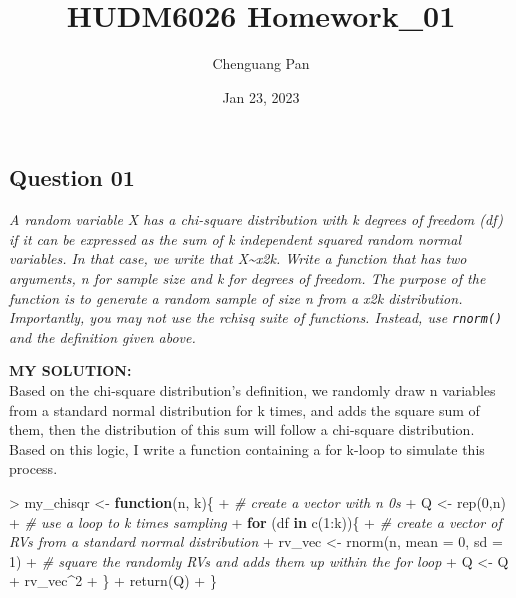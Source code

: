 \documentclass[
]{article}
\title{HUDM6026 Homework\_01}
\author{Chenguang Pan}
\date{Jan 23, 2023}
\newenvironment{Shaded}{\begin{snugshade}}{\end{snugshade}}
\newcommand{\AttributeTok}[1]{\textcolor[rgb]{0.77,0.63,0.00}{#1}}
\newcommand{\CommentTok}[1]{\textcolor[rgb]{0.56,0.35,0.01}{\textit{#1}}}
\newcommand{\ControlFlowTok}[1]{\textcolor[rgb]{0.13,0.29,0.53}{\textbf{#1}}}
\newcommand{\DecValTok}[1]{\textcolor[rgb]{0.00,0.00,0.81}{#1}}
\newcommand{\FunctionTok}[1]{\textcolor[rgb]{0.00,0.00,0.00}{#1}}
\newcommand{\NormalTok}[1]{#1}
\newcommand{\OtherTok}[1]{\textcolor[rgb]{0.56,0.35,0.01}{#1}}
\newcommand{\SpecialCharTok}[1]{\textcolor[rgb]{0.00,0.00,0.00}{#1}}
\begin{document}
\maketitle

\hypertarget{question-01}{%
\subsection{Question 01}\label{question-01}}

\emph{A random variable X has a chi-square distribution with k degrees
of freedom (df) if it can be expressed as the sum of k independent
squared random normal variables. In that case, we write that
X\textasciitilde x2k. Write a function that has two arguments, n for
sample size and k for degrees of freedom. The purpose of the function is
to generate a random sample of size n from a x2k distribution.
Importantly, you may not use the rchisq suite of functions. Instead, use
\texttt{rnorm()} and the definition given above. }

\textbf{MY SOLUTION:}\\
Based on the chi-square distribution's definition, we randomly draw n
variables from a standard normal distribution for k times, and adds the
square sum of them, then the distribution of this sum will follow a
chi-square distribution. Based on this logic, I write a function
containing a for k-loop to simulate this process.

\begin{Shaded}
\begin{Highlighting}[]
\SpecialCharTok{\textgreater{}}\NormalTok{ my\_chisqr }\OtherTok{\textless{}{-}} \ControlFlowTok{function}\NormalTok{(n, k)\{}
\SpecialCharTok{+}   \CommentTok{\# create a vector with n 0s}
\SpecialCharTok{+}\NormalTok{   Q }\OtherTok{\textless{}{-}} \FunctionTok{rep}\NormalTok{(}\DecValTok{0}\NormalTok{,n)}
\SpecialCharTok{+}   \CommentTok{\# use a loop to k times sampling}
\SpecialCharTok{+}   \ControlFlowTok{for}\NormalTok{ (df }\ControlFlowTok{in} \FunctionTok{c}\NormalTok{(}\DecValTok{1}\SpecialCharTok{:}\NormalTok{k))\{}
\SpecialCharTok{+}     \CommentTok{\# create a vector of RVs from a standard normal distribution}
\SpecialCharTok{+}\NormalTok{     rv\_vec }\OtherTok{\textless{}{-}} \FunctionTok{rnorm}\NormalTok{(n, }\AttributeTok{mean =} \DecValTok{0}\NormalTok{, }\AttributeTok{sd =} \DecValTok{1}\NormalTok{)}
\SpecialCharTok{+}     \CommentTok{\# square the randomly RVs and adds them up within the for loop}
\SpecialCharTok{+}\NormalTok{     Q }\OtherTok{\textless{}{-}}\NormalTok{ Q }\SpecialCharTok{+}\NormalTok{ rv\_vec}\SpecialCharTok{\^{}}\DecValTok{2}
\SpecialCharTok{+}\NormalTok{   \}}
\SpecialCharTok{+}   \FunctionTok{return}\NormalTok{(Q)}
\SpecialCharTok{+}\NormalTok{ \}}
\end{Highlighting}
\end{Shaded}
\end{document}
